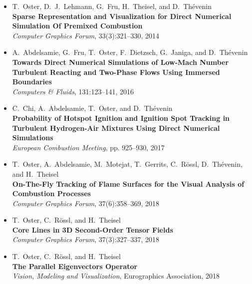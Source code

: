 %
\begin{itemize}[label={},leftmargin=0pt]
    \item T.~Oster, D.~J.~Lehmann, G.~Fru, H.~Theisel, and D.~Thévenin\\
        \textbf{Sparse Representation and Visualization for Direct Numerical Simulation Of
        Premixed Combustion}\\
        {\small \emph{Computer Graphics Forum}, 33(3):321--330, 2014}

    \item A.~Abdelsamie, G.~Fru, T.~Oster, F.~Dietzsch, G.~Janiga, and D.~Thévenin\\
        \textbf{Towards Direct Numerical Simulations of Low-Mach Number Turbulent Reacting
        and Two-Phase Flows Using Immersed Boundaries}\\
        {\small \emph{Computers \& Fluids}, 131:123--141, 2016}

    \item C.~Chi, A.~Abdelsamie, T.~Oster, and D.~Thévenin\\
        \textbf{Probability of Hotspot Ignition and Ignition Spot Tracking in
        Turbulent Hydrogen-Air Mixtures Using Direct Numerical Simulations}\\
        {\small \emph{ European Combustion Meeting}, pp. 925--930, 2017}

    \item T.~Oster, A.~Abdelsamie, M.~Motejat, T.~Gerrits, C.~Rössl, D.~Thévenin, and H.~Theisel\\
        \textbf{On-The-Fly Tracking of Flame Surfaces for the Visual Analysis
        of Combustion Processes}\\
        {\small \emph{Computer Graphics Forum}, 37(6):358--369, 2018}

    \item T.~Oster, C.~Rössl, and H.~Theisel\\
        \textbf{Core Lines in 3D Second-Order Tensor Fields}\\
        {\small \emph{Computer Graphics Forum}, 37(3):327--337, 2018}

    \item T.~Oster, C.~Rössl, and H.~Theisel\\
        \textbf{The Parallel Eigenvectors Operator}\\
        {\small \emph{Vision, Modeling and Visualization}, Eurographics Association, 2018}
\end{itemize}

%
